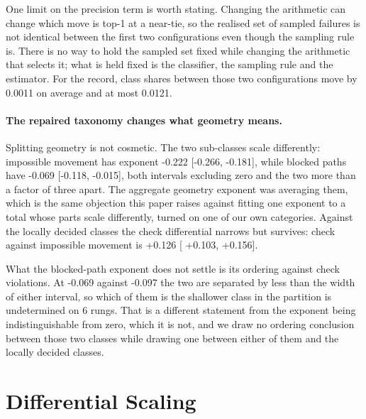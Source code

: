 \documentclass[11pt]{article}
\begin{document}
One limit on the precision term is worth stating. Changing the arithmetic can change
which move is top-1 at a near-tie, so the realised set of sampled failures is not
identical between the first two configurations even though the sampling rule is.
There is no way to hold the sampled set fixed while changing the arithmetic that
selects it; what is held fixed is the classifier, the sampling rule and the estimator.
For the record, class shares between those two configurations move by 0.0011
on average and at most 0.0121.

\paragraph{The repaired taxonomy changes what geometry means.}
Splitting geometry is not cosmetic. The two sub-classes scale differently: impossible
movement has exponent -0.222 [-0.266, -0.181], while blocked
paths have -0.069 [-0.118, -0.015], both intervals
excluding zero and the two more than a factor of three apart. The aggregate geometry
exponent was averaging them, which is the same objection this paper raises against
fitting one exponent to a total whose parts scale differently, turned on one of our
own categories. Against the locally decided classes the check differential narrows
but survives: check against impossible movement is +0.126 [
+0.103, +0.156].

What the blocked-path exponent does not settle is its ordering against check
violations. At -0.069 against -0.097 the two are separated by less than the
width of either interval, so which of them is the shallower class in the partition is
undetermined on 6 rungs. That is a different statement from the exponent being
indistinguishable from zero, which it is not, and we draw no ordering conclusion
between those two classes while drawing one between either of them and the locally
decided classes.

\section{Differential Scaling}
\label{sec:scaling}
\end{document}
